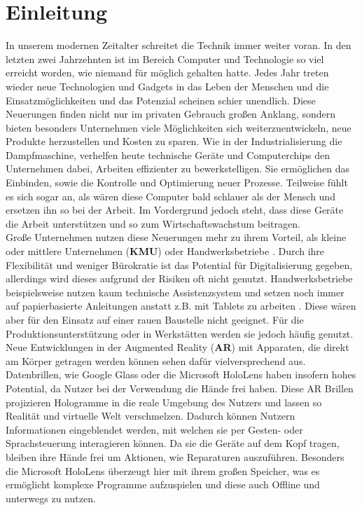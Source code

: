 \chapter{Einleitung}

In unserem modernen Zeitalter schreitet die Technik immer weiter voran. In den letzten zwei Jahrzehnten ist im Bereich Computer und Technologie so viel erreicht worden, wie niemand für möglich gehalten hatte. Jedes Jahr treten wieder neue Technologien und Gadgets in das Leben der Menschen und die Einsatzmöglichkeiten und das Potenzial scheinen schier unendlich. Diese Neuerungen finden nicht nur im privaten Gebrauch großen Anklang, sondern bieten besonders Unternehmen viele Möglichkeiten sich weiterzuentwickeln, neue Produkte herzustellen und Kosten zu sparen. Wie in der Industrialisierung die Dampfmaschine, verhelfen heute technische Geräte und Computerchips den Unternehmen dabei, Arbeiten effizienter zu bewerkstelligen. Sie ermöglichen das Einbinden, sowie die Kontrolle und Optimierung neuer Prozesse. Teilweise fühlt es sich sogar an, als wären diese Computer bald schlauer als der Mensch und ersetzen ihn so bei der Arbeit. Im Vordergrund jedoch steht, dass diese Geräte die Arbeit unterstützen und so zum Wirtschaftswachstum beitragen. \\
Große Unternehmen nutzen diese Neuerungen mehr zu ihrem Vorteil, als kleine oder mittlere Unternehmen (\textbf{KMU}) oder Handwerksbetriebe \cite{hateful_six_krcmar}. Durch ihre Flexibilität und weniger Bürokratie ist das Potential für Digitalisierung gegeben, allerdings wird dieses aufgrund der Risiken oft nicht genutzt. Handwerksbetriebe beispielsweise nutzen kaum technische Assistenzsystem und  setzen noch immer auf papierbasierte Anleitungen anstatt z.B. mit Tablets zu arbeiten \cite{zheng_eye-wearable_2015}. Diese wären aber für den Einsatz auf einer rauen Baustelle nicht geeignet. Für die Produktionsunterstützung oder in Werkstätten werden sie jedoch häufig genutzt. \\
Neue Entwicklungen in der Augmented Reality (\textbf{AR}) mit Apparaten, die direkt am Körper getragen werden können \cite{zheng_eye-wearable_2015} sehen dafür vielversprechend aus. Datenbrillen, wie Google Glass oder die Microsoft HoloLens haben insofern hohes Potential, da Nutzer bei der Verwendung die Hände frei haben. Diese AR Brillen projizieren Hologramme in die reale Umgebung des Nutzers und lassen so Realität und virtuelle Welt verschmelzen. Dadurch können Nutzern Informationen eingeblendet werden, mit welchen sie per Gesten- oder Sprachsteuerung interagieren können. Da sie die Geräte auf dem Kopf tragen, bleiben ihre Hände frei um Aktionen, wie Reparaturen auszuführen. Besonders die Microsoft HoloLens überzeugt hier mit ihrem großen Speicher, was es ermöglicht komplexe Programme aufzuspielen und diese auch Offline und unterwegs zu nutzen.

